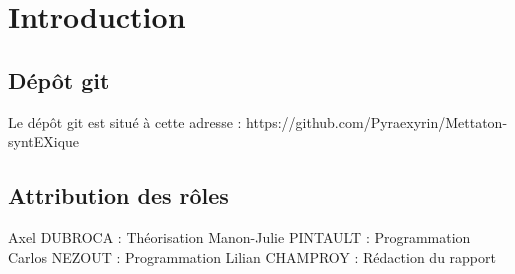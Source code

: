 \chapter{Introduction}

\section{Dépôt git}

Le dépôt git est situé à cette adresse : https://github.com/Pyraexyrin/Mettaton-syntEXique

\section{Attribution des rôles}

Axel DUBROCA : Théorisation \newline
Manon-Julie PINTAULT : Programmation \newline
Carlos NEZOUT : Programmation \newline
Lilian CHAMPROY : Rédaction du rapport \newline